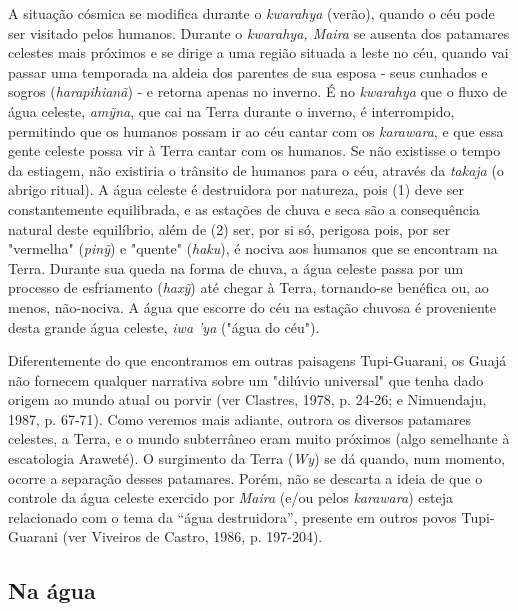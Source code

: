 A situação cósmica se modifica durante o \emph{kwarahya} (verão), quando
o céu pode ser visitado pelos humanos. Durante o \emph{kwarahya, Maira}
se ausenta dos patamares celestes mais próximos e se dirige a uma região
situada a leste no céu, quando vai passar uma temporada na aldeia dos
parentes de sua esposa - seus cunhados e sogros (\emph{harapihianã}) - e
retorna apenas no inverno. É no \emph{kwarahya} que o fluxo de água
celeste, \emph{amỹna}, que cai na Terra durante o inverno, é
interrompido, permitindo que os humanos possam ir ao céu cantar com os
\emph{karawara}, e que essa gente celeste possa vir à Terra cantar com
os humanos. Se não existisse o tempo da estiagem, não existiria o
trânsito de humanos para o céu, através da \emph{takaja} (o abrigo
ritual). A água celeste é destruidora por natureza, pois (1) deve ser
constantemente equilibrada, e as estações de chuva e seca são a
consequência natural deste equilíbrio, além de (2) ser, por si só,
perigosa pois, por ser "vermelha" (\emph{pinỹ}) e "quente"
(\emph{haku}), é nociva aos humanos que se encontram na Terra. Durante
sua queda na forma de chuva, a água celeste passa por um processo de
esfriamento (\emph{haxỹ}) até chegar à Terra, tornando-se benéfica ou,
ao menos, não-nociva. A água que escorre do céu na estação chuvosa é
proveniente desta grande água celeste, \emph{iwa 'ya} ("água do céu").

Diferentemente do que encontramos em outras paisagens Tupi-Guarani, os
Guajá não fornecem qualquer narrativa sobre um "dilúvio universal" que
tenha dado origem ao mundo atual ou porvir (ver Clastres, 1978, p.
24-26; e Nimuendaju, 1987, p. 67-71). Como veremos mais adiante, outrora
os diversos patamares celestes, a Terra, e o mundo subterrâneo eram
muito próximos (algo semelhante à escatologia Araweté). O surgimento da
Terra (\emph{Wy}) se dá quando, num momento, ocorre a separação desses
patamares. Porém, não se descarta a ideia de que o controle da água
celeste exercido por \emph{Maira} (e/ou pelos \emph{karawara}) esteja
relacionado com o tema da ``água destruidora'', presente em outros povos
Tupi-Guarani (ver Viveiros de Castro, 1986, p. 197-204).

\hypertarget{na-uxe1gua}{%
\subsection{Na água}\label{na-uxe1gua}}

